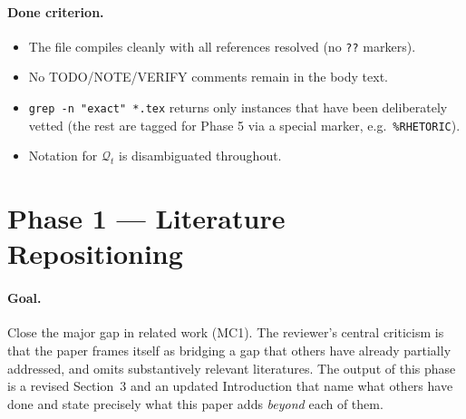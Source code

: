 \documentclass[11pt]{article}
\begin{document}
\paragraph{Done criterion.}
\begin{itemize}[leftmargin=*]
\item The file compiles cleanly with all references resolved (no \verb|??| markers).
\item No TODO/NOTE/VERIFY comments remain in the body text.
\item \texttt{grep -n "exact" *.tex} returns only instances that have been deliberately vetted (the rest are tagged for Phase 5 via a special marker, e.g.\ \texttt{\%RHETORIC}).
\item Notation for $\mathcal{Q}_t$ is disambiguated throughout.
\end{itemize}

\section{Phase 1 --- Literature Repositioning}
\label{sec:phase1}

\paragraph{Goal.} Close the major gap in related work (MC1). The reviewer's central criticism is that the paper frames itself as bridging a gap that others have already partially addressed, and omits substantively relevant literatures. The output of this phase is a revised Section~3 and an updated Introduction that name what others have done and state precisely what this paper adds \emph{beyond} each of them.
\end{document}
